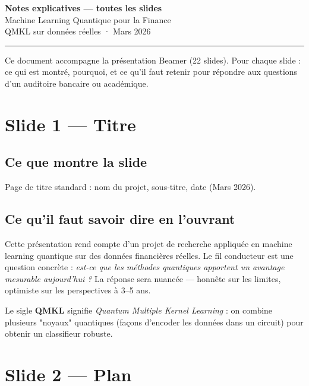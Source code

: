 \documentclass[12pt, a4paper]{article}
\begin{document}
\begin{center}
  {\LARGE\bfseries\color{qblue} Notes explicatives — toutes les slides}\\[6pt]
  {\large Machine Learning Quantique pour la Finance}\\[4pt]
  {\normalsize QMKL sur données réelles · Mars 2026}
\end{center}
\vspace{4pt}\hrule\vspace{10pt}

Ce document accompagne la présentation Beamer (22 slides).
Pour chaque slide : ce qui est montré, pourquoi, et ce qu'il faut retenir
pour répondre aux questions d'un auditoire bancaire ou académique.

\tableofcontents
\newpage

\section{Slide 1 — Titre}

\subsection*{Ce que montre la slide}

Page de titre standard : nom du projet, sous-titre, date (Mars 2026).

\subsection*{Ce qu'il faut savoir dire en l'ouvrant}

Cette présentation rend compte d'un projet de recherche appliquée en machine learning quantique
sur des données financières réelles. Le fil conducteur est une question concrète :
\emph{est-ce que les méthodes quantiques apportent un avantage mesurable aujourd'hui ?}
La réponse sera nuancée — honnête sur les limites, optimiste sur les perspectives à 3--5 ans.

Le sigle \textbf{QMKL} signifie \emph{Quantum Multiple Kernel Learning} :
on combine plusieurs "noyaux" quantiques (façons d'encoder les données dans un circuit)
pour obtenir un classifieur robuste.

\section{Slide 2 — Plan}
\end{document}
